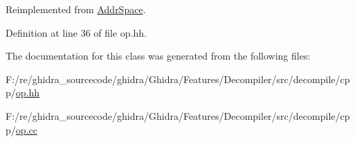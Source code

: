 Reimplemented from \mbox{\hyperlink{class_addr_space_a67510a8345fcc17157cc0389e757d504}{Addr\+Space}}.



Definition at line 36 of file op.\+hh.



The documentation for this class was generated from the following files\+:\begin{DoxyCompactItemize}
\item 
F\+:/re/ghidra\+\_\+sourcecode/ghidra/\+Ghidra/\+Features/\+Decompiler/src/decompile/cpp/\mbox{\hyperlink{op_8hh}{op.\+hh}}\item 
F\+:/re/ghidra\+\_\+sourcecode/ghidra/\+Ghidra/\+Features/\+Decompiler/src/decompile/cpp/\mbox{\hyperlink{op_8cc}{op.\+cc}}\end{DoxyCompactItemize}
